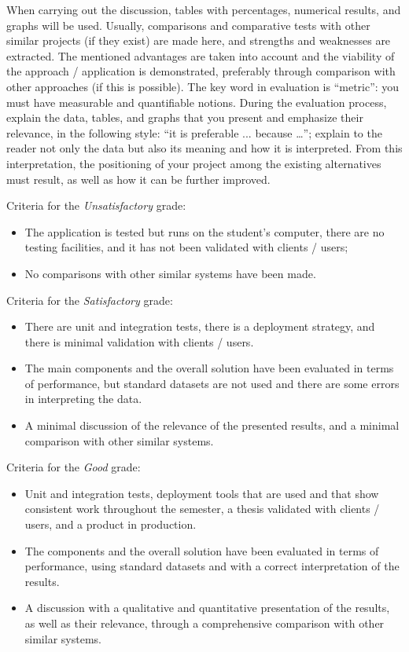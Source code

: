 \documentclass[12pt,a4paper]{report}
\newcommand{\worktype}[1]{[\textit{#1}] }
\newcommand{\dezvoltare}{\worktype{Product development}}
\newcommand{\cercetare}{\worktype{Research}}
\newcommand{\ambele}{\worktype{Both}}
\begin{document}
When carrying out the discussion, tables with percentages, numerical results, and graphs will be used. Usually, comparisons and comparative tests with other similar projects (if they exist) are made here, and strengths and weaknesses are extracted. The mentioned advantages are taken into account and the viability of the approach / application is demonstrated, preferably through comparison with other approaches (if this is possible). The key word in evaluation is ``metric'': you must have measurable and quantifiable notions. During the evaluation process, explain the data, tables, and graphs that you present and emphasize their relevance, in the following style: ``it is preferable ... because …''; explain to the reader not only the data but also its meaning and how it is interpreted. From this interpretation, the positioning of your project among the existing alternatives must result, as well as how it can be further improved.

Criteria for the \textit{Un\textit{satisfactory}} grade:
\begin{itemize}
	\item The application is tested but runs on the student's computer, there are no testing facilities, and it has not been validated with clients / users;
	\item No comparisons with other similar systems have been made.
\end{itemize}

Criteria for the \textit{Satisfactory} grade:
\begin{itemize}
	\item \dezvoltare  There are unit and integration tests, there is a deployment strategy, and there is minimal validation with clients / users.
	\item \cercetare The main components and the overall solution have been evaluated in terms of performance, but standard datasets are not used and there are some errors in interpreting the data.
	\item \ambele A minimal discussion of the relevance of the presented results, and a minimal comparison with other similar systems.
\end{itemize}

Criteria for the \textit{Good} grade:
\begin{itemize}
	\item \dezvoltare Unit and integration tests, deployment tools that are used and that show consistent work throughout the semester, a thesis validated with clients / users, and a product in production.
	\item \cercetare The components and the overall solution have been evaluated in terms of performance, using standard datasets and with a correct interpretation of the results.
	\item \ambele A discussion with a qualitative and quantitative presentation of the results, as well as their relevance, through a comprehensive comparison with other similar systems.
\end{itemize}
\end{document}
